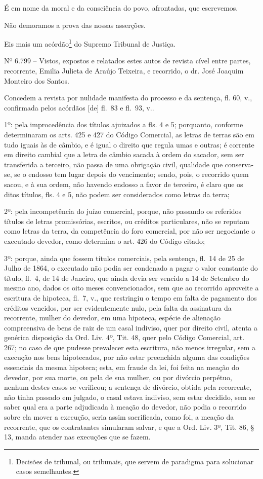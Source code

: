 É em nome da moral e da consciência do povo, afrontadas, que escrevemos.

Não demoramos a prova das nossas asserções.

Eis mais um acórdão\footnote{Decisões de tribunal, ou tribunais, que
  servem de paradigma para solucionar casos semelhantes.} do Supremo
Tribunal de Justiça.

Nº 6.799 -- Vistos, expostos e relatados estes autos de revista cível
entre partes, recorrente, Emilia Julieta de Araújo Teixeira, e
recorrido, o dr. José Joaquim Monteiro dos Santos.

Concedem a revista por nulidade manifesta do processo e da sentença, fl.
60, v., confirmada pelos acórdãos {[}de{]} fl.~83 e fl.~93, v..

1º: pela improcedência dos títulos ajuizados a fls. 4 e 5; porquanto,
conforme determinaram os arts. 425 e 427 do Código Comercial, as letras
de terras são em tudo iguais às de câmbio, e é igual o direito que
regula umas e outras; é corrente em direito cambial que a letra de
câmbio sacada à ordem do sacador, sem ser transferida a terceiro, não
passa de uma obrigação civil, qualidade que conserva-se, se o endosso
tem lugar depois do vencimento; sendo, pois, o recorrido quem sacou, e à
sua ordem, não havendo endosso a favor de terceiro, é claro que os ditos
títulos, fls. 4 e 5, não podem ser considerados como letras da terra;

2º: pela incompetência do juízo comercial, porque, não passando os
referidos títulos de letras promissórias, escritos, ou créditos
particulares, não se reputam como letras da terra, da competência do
foro comercial, por não ser negociante o executado devedor, como
determina o art. 426 do Código citado;

3º: porque, ainda que fossem títulos comerciais, pela sentença, fl.~14
de 25 de Julho de 1864, o executado não podia ser condenado a pagar o
valor constante do título, fl.~4, de 14 de Janeiro, que ainda devia ser
vencido a 14 de Setembro do mesmo ano, dados os oito meses
convencionados, sem que ao recorrido aproveite a escritura de hipoteca,
fl.~7, v., que restringiu o tempo em falta de pagamento dos créditos
vencidos, por ser evidentemente nulo, pela falta da assinatura da
recorrente, mulher do devedor, em uma hipoteca, espécie de alienação
compreensiva de bens de raiz de um casal indiviso, quer por direito
civil, atenta a genérica disposição da Ord. Liv. 4º, Tit. 48, quer pelo
Código Comercial, art. 267; no caso de que pudesse prevalecer esta
escritura, não menos irregular, sem a execução nos bens hipotecados, por
não estar preenchida alguma das condições essenciais da mesma hipoteca;
esta, em fraude da lei, foi feita na meação do devedor, por sua morte,
ou pela de sua mulher, ou por divórcio perpétuo, nenhum destes casos se
verificou; a sentença de divórcio, obtida pela recorrente, não tinha
passado em julgado, o casal estava indiviso, sem estar decidido, sem se
saber qual era a parte adjudicada à meação do devedor, não podia o
recorrido sobre ela mover a execução, seria assim sacrificada, como foi,
a meação da recorrente, que os contratantes simularam salvar, e que a
Ord. Liv. 3º, Tit. 86, § 13, manda atender nas execuções que se fazem.

